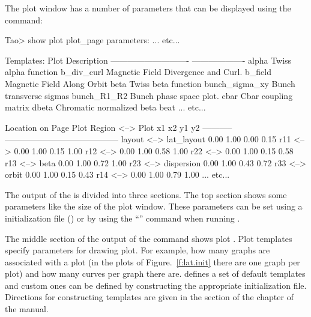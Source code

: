 \documentclass{hitec}
\begin{document}
The plot window has a number of parameters that can be displayed using the 
command:

\begin{code}
Tao> show plot
plot_page parameters:
... etc...

Templates:
   Plot                                    Description
   ----------------------------            -------------------
   alpha                                   Twiss alpha function
   b_div_curl                              Magnetic Field Divergence and Curl.
   b_field                                 Magnetic Field Along Orbit
   beta                                    Twiss beta function
   bunch_sigma_xy                          Bunch transverse sigmas
   bunch_R1_R2                             Bunch phase space plot.
   cbar                                    Cbar coupling matrix
   dbeta                                   Chromatic normalized beta beat
... etc...

                                               Location on Page
Plot Region         <-->  Plot                 x1    x2    y1    y2
-----------               -----------------------------------------
layout              <-->  lat_layout          0.00  1.00  0.00  0.15
r11                 <-->                      0.00  1.00  0.15  1.00
r12                 <-->                      0.00  1.00  0.58  1.00
r22                 <-->                      0.00  1.00  0.15  0.58
r13                 <-->  beta                0.00  1.00  0.72  1.00
r23                 <-->  dispersion          0.00  1.00  0.43  0.72
r33                 <-->  orbit               0.00  1.00  0.15  0.43
r14                 <-->                      0.00  1.00  0.79  1.00
... etc...
\end{code}
The output of the  is divided into three sections. The top section
shows some parameters like the size of the plot window. These parameters can be 
set using a \tao initialization file () or by using the ``''
command when running \tao.

The middle section of the output of the  command shows plot .
Plot templates specify parameters for drawing plot. For example, how many graphs are
associated with a plot (in the plots of Figure.~\ref{f:lat.init} there are one graph per plot)
and how many curves per graph there are. \tao defines a set of default templates and custom
ones can be defined by constructing the appropriate initialization file. Directions for
constructing templates are given in the  section of the  chapter of the \tao manual.
\end{document}
